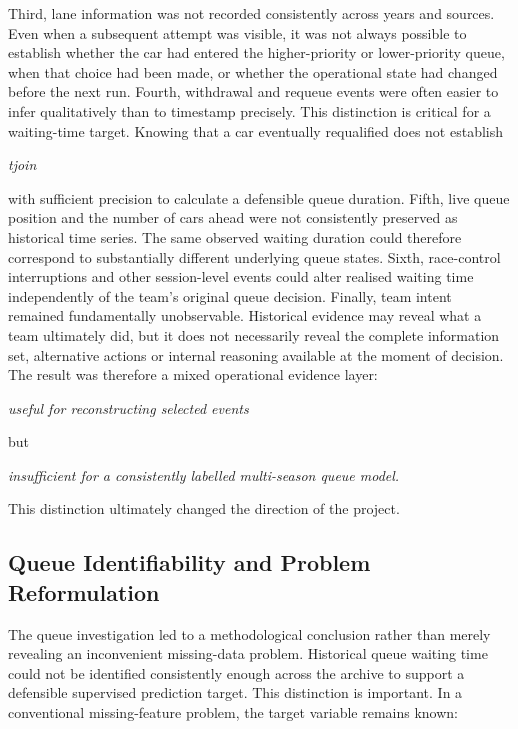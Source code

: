 Third, lane information was not recorded consistently across years and sources. Even when a subsequent attempt was visible, it was not always possible to establish whether the car had entered the higher-priority or lower-priority queue, when that choice had been made, or whether the operational state had changed before the next run. Fourth, withdrawal and requeue events were often easier to infer qualitatively than to timestamp precisely. This distinction is critical for a waiting-time target. Knowing that a car eventually requalified does not establish

\begin{center}\textit{tjoin}\end{center}

with sufficient precision to calculate a defensible queue duration. Fifth, live queue position and the number of cars ahead were not consistently preserved as historical time series. The same observed waiting duration could therefore correspond to substantially different underlying queue states. Sixth, race-control interruptions and other session-level events could alter realised waiting time independently of the team's original queue decision. Finally, team intent remained fundamentally unobservable. Historical evidence may reveal what a team ultimately did, but it does not necessarily reveal the complete information set, alternative actions or internal reasoning available at the moment of decision. The result was therefore a mixed operational evidence layer:

\begin{center}\textit{useful for reconstructing selected events}\end{center}

but

\begin{center}\textit{insufficient for a consistently labelled multi-season queue model.}\end{center}

This distinction ultimately changed the direction of the project.

\subsection{Queue Identifiability and Problem Reformulation}
The queue investigation led to a methodological conclusion rather than merely revealing an inconvenient missing-data problem. Historical queue waiting time could not be identified consistently enough across the archive to support a defensible supervised prediction target. This distinction is important. In a conventional missing-feature problem, the target variable remains known:

